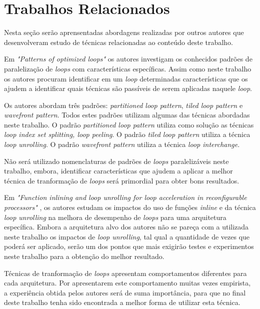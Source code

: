 
\chapter{Trabalhos Relacionados}

Nesta seção serão aprensentadas abordagens realizadas por outros autores que 
desenvolveram estudo de técnicas relacionadas ao conteúdo deste trabalho.

Em \textit{"Patterns of optimized loops"} \cite{Tasharofi:2010} os autores
investigam os conhecidos padrões de paralelização de \textit{loops} com
características específicas.  
Assim como neste trabalho os autores procuram identificar em um 
\textit{loop} determinadas características que os ajudem a identificar quais
técnicas são passíveis de serem aplicadas naquele \textit{loop}.

Os autores abordam três padrões: \textit{partitioned loop pattern}, \textit{tiled
loop pattern} e \textit{wavefront pattern}. 
Todos estes padrões utilizam algumas das técnicas abordadas neste trabalho. 
O padrão \textit{partitioned loop pattern} utiliza como solução as técnicas
\textit{loop index set splitting, loop peeling}. 
O padrão \textit{tiled loop pattern} utiliza a técnica \textit{loop unrolling}. 
O padrão \textit{wavefront pattern} utiliza a técnica \textit{loop interchange}.

Não será utilizado nomenclaturas de padrões de \textit{loops} paralelizáveis
neste trabalho, embora, identificar características que ajudem a aplicar a
melhor técnica de tranformação de \textit{loops} será primordial para obter bons
resultados.


Em \textit{"Function inlining and loop unrolling for loop acceleration in
reconfigurable processors"} \cite{Miniskar:2012}, os autores estudam os impactos
do uso de funções \textit{inline} e da técnica \textit{loop unrolling} na
melhora de desempenho de \textit{loops} para uma arquitetura específica.
Embora a arquitetura alvo dos autores não se pareça com a utilizada neste trabalho 
os impactos de \textit{loop unrolling}, tal qual a quantidade de vezes que poderá ser 
aplicado, serão um dos pontos que mais exigirão testes e experimentos neste 
trabalho para a obtenção do melhor resultado.

Técnicas de tranformação de \textit{loops} apresentam comportamentos diferentes 
para cada arquitetura. 
Por apresentarem este comportamento muitas vezes empirista, a experiência obtida
pelos autores será de suma importância, para que no final deste trabalho tenha
sido encontrada a melhor forma de utilizar esta técnica.

